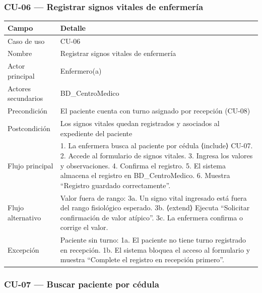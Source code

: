 \documentclass[11pt,a4paper]{article}
\begin{document}
	\subsubsection{CU-06 --- Registrar signos vitales de enfermería}
	
	\begin{longtable}{p{} p{} }
		
		
		\toprule
		\textbf{Campo} &
		\textbf{Detalle}  \\
		\midrule
		\endhead
		
		Caso de uso & CU-06 \\
		Nombre & Registrar signos vitales de enfermería \\
		Actor principal & Enfermero(a) \\
		Actores secundarios & BD\_CentroMedico \\
		Precondición & El paciente cuenta con turno asignado por recepción (CU-08) \\
		Postcondición & Los signos vitales quedan registrados y asociados al expediente del paciente \\
		Flujo principal & 1. La enfermera busca al paciente por cédula ⟨include⟩ CU-07. 2. Accede al formulario de signos vitales. 3. Ingresa los valores y observaciones. 4. Confirma el registro. 5. El sistema almacena el registro en BD\_CentroMedico. 6. Muestra ``Registro guardado correctamente''. \\
		Flujo alternativo & Valor fuera de rango: 3a. Un signo vital ingresado está fuera del rango fisiológico esperado. 3b. ⟨extend⟩ Ejecuta ``Solicitar confirmación de valor atípico''. 3c. La enfermera confirma o corrige el valor. \\
		Excepción & Paciente sin turno: 1a. El paciente no tiene turno registrado en recepción. 1b. El sistema bloquea el acceso al formulario y muestra ``Complete el registro en recepción primero''. \\
		\bottomrule
	\end{longtable}
	
	\subsubsection{CU-07 --- Buscar paciente por cédula}
	
\end{document}
